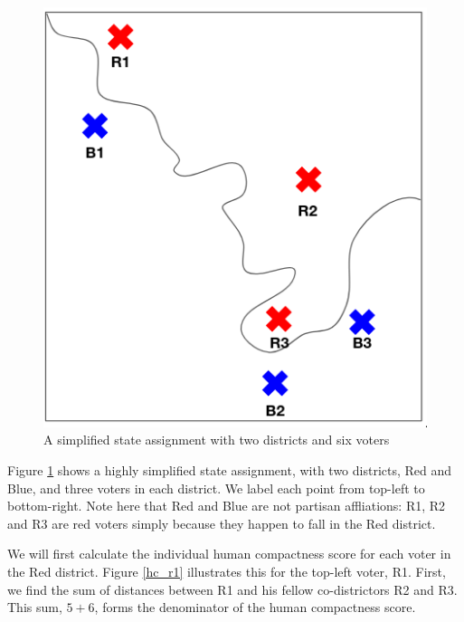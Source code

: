\documentclass[]{article}
\begin{document}
\begin{figure}
\centering
\includegraphics{img/human_compactness_1.png}
\caption{A simplified state assignment with two districts and six voters
\label{hc_demo}}
\end{figure}

Figure \ref{hc_demo} shows a highly simplified state assignment, with
two districts, Red and Blue, and three voters in each district. We label
each point from top-left to bottom-right. Note here that Red and Blue
are not partisan affliations: R1, R2 and R3 are red voters simply
because they happen to fall in the Red district.

We will first calculate the individual human compactness score for each
voter in the Red district. Figure \ref{hc_r1} illustrates this for the
top-left voter, R1. First, we find the sum of distances between R1 and
his fellow co-districtors R2 and R3. This sum, \(5 + 6\), forms the
denominator of the human compactness score.
\end{document}
